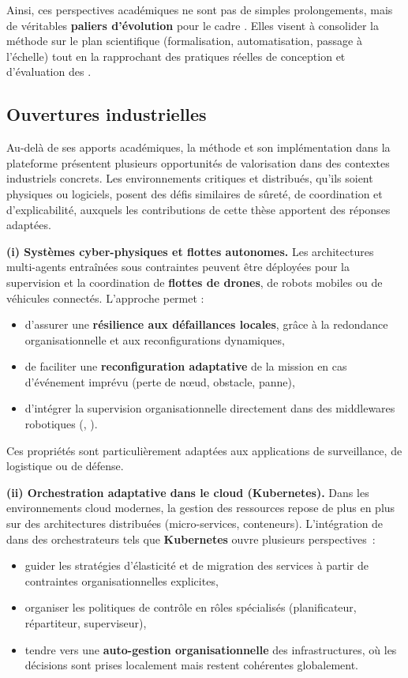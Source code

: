 \medskip
\noindent
Ainsi, ces perspectives académiques ne sont pas de simples prolongements, mais de véritables \textbf{paliers d’évolution} pour le cadre .
Elles visent à consolider la méthode sur le plan scientifique (formalisation, automatisation, passage à l’échelle) tout en la rapprochant des pratiques réelles de conception et d’évaluation des .

\subsection*{Ouvertures industrielles}

Au-delà de ses apports académiques, la méthode  et son implémentation dans la plateforme  présentent plusieurs opportunités de valorisation dans des contextes industriels concrets.
Les environnements critiques et distribués, qu’ils soient physiques ou logiciels, posent des défis similaires de sûreté, de coordination et d’explicabilité, auxquels les contributions de cette thèse apportent des réponses adaptées.

\medskip
\noindent
\textbf{(i) Systèmes cyber-physiques et flottes autonomes.}
Les architectures multi-agents entraînées sous contraintes peuvent être déployées pour la supervision et la coordination de \textbf{flottes de drones}, de robots mobiles ou de véhicules connectés.
L’approche  permet :
\begin{itemize}
  \item d’assurer une \textbf{résilience aux défaillances locales}, grâce à la redondance organisationnelle et aux reconfigurations dynamiques,
  \item de faciliter une \textbf{reconfiguration adaptative} de la mission en cas d’événement imprévu (perte de nœud, obstacle, panne),
  \item d’intégrer la supervision organisationnelle directement dans des middlewares robotiques (, ).
\end{itemize}
Ces propriétés sont particulièrement adaptées aux applications de surveillance, de logistique ou de défense.

\medskip
\noindent
\textbf{(ii) Orchestration adaptative dans le cloud (Kubernetes).}
Dans les environnements cloud modernes, la gestion des ressources repose de plus en plus sur des architectures distribuées (micro-services, conteneurs).
L’intégration de  dans des orchestrateurs tels que \textbf{Kubernetes} ouvre plusieurs perspectives~:
\begin{itemize}
  \item guider les stratégies d’élasticité et de migration des services à partir de contraintes organisationnelles explicites,
  \item organiser les politiques de contrôle en rôles spécialisés (planificateur, répartiteur, superviseur),
  \item tendre vers une \textbf{auto-gestion organisationnelle} des infrastructures, où les décisions sont prises localement mais restent cohérentes globalement.
\end{itemize}

